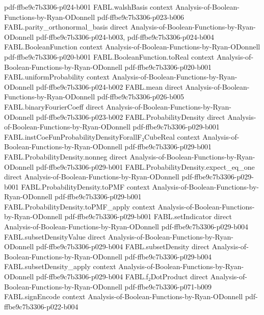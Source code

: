 \begin{theorem}
  {pdf-ffbe9c7b3306-p024-b001}
\proofstep
  {FABL.walshBasis}
  {context}
  {Analysis-of-Boolean-Functions-by-Ryan-ODonnell}
  {pdf-ffbe9c7b3306-p023-b006}
\proofstep
  {FABL.parity_orthonormal_basis}
  {direct}
  {Analysis-of-Boolean-Functions-by-Ryan-ODonnell}
  {pdf-ffbe9c7b3306-p024-b003,
    pdf-ffbe9c7b3306-p024-b004}
\proofstep
  {FABL.BooleanFunction}
  {context}
  {Analysis-of-Boolean-Functions-by-Ryan-ODonnell}
  {pdf-ffbe9c7b3306-p020-b001}
\proofstep
  {FABL.BooleanFunction.toReal}
  {context}
  {Analysis-of-Boolean-Functions-by-Ryan-ODonnell}
  {pdf-ffbe9c7b3306-p020-b001}
\proofstep
  {FABL.uniformProbability}
  {context}
  {Analysis-of-Boolean-Functions-by-Ryan-ODonnell}
  {pdf-ffbe9c7b3306-p024-b002}
\proofstep
  {FABL.mean}
  {direct}
  {Analysis-of-Boolean-Functions-by-Ryan-ODonnell}
  {pdf-ffbe9c7b3306-p026-b005}
\proofstep
  {FABL.binaryFourierCoeff}
  {direct}
  {Analysis-of-Boolean-Functions-by-Ryan-ODonnell}
  {pdf-ffbe9c7b3306-p023-b002}
\proofstep
  {FABL.ProbabilityDensity}
  {direct}
  {Analysis-of-Boolean-Functions-by-Ryan-ODonnell}
  {pdf-ffbe9c7b3306-p029-b001}
\proofstep
  {FABL.instCoeFunProbabilityDensityForallF₂CubeReal}
  {context}
  {Analysis-of-Boolean-Functions-by-Ryan-ODonnell}
  {pdf-ffbe9c7b3306-p029-b001}
\proofstep
  {FABL.ProbabilityDensity.nonneg}
  {direct}
  {Analysis-of-Boolean-Functions-by-Ryan-ODonnell}
  {pdf-ffbe9c7b3306-p029-b001}
\proofstep
  {FABL.ProbabilityDensity.expect_eq_one}
  {direct}
  {Analysis-of-Boolean-Functions-by-Ryan-ODonnell}
  {pdf-ffbe9c7b3306-p029-b001}
\proofstep
  {FABL.ProbabilityDensity.toPMF}
  {context}
  {Analysis-of-Boolean-Functions-by-Ryan-ODonnell}
  {pdf-ffbe9c7b3306-p029-b001}
\proofstep
  {FABL.ProbabilityDensity.toPMF_apply}
  {context}
  {Analysis-of-Boolean-Functions-by-Ryan-ODonnell}
  {pdf-ffbe9c7b3306-p029-b001}
\proofstep
  {FABL.setIndicator}
  {direct}
  {Analysis-of-Boolean-Functions-by-Ryan-ODonnell}
  {pdf-ffbe9c7b3306-p029-b004}
\proofstep
  {FABL.subsetDensityValue}
  {direct}
  {Analysis-of-Boolean-Functions-by-Ryan-ODonnell}
  {pdf-ffbe9c7b3306-p029-b004}
\proofstep
  {FABL.subsetDensity}
  {direct}
  {Analysis-of-Boolean-Functions-by-Ryan-ODonnell}
  {pdf-ffbe9c7b3306-p029-b004}
\proofstep
  {FABL.subsetDensity_apply}
  {context}
  {Analysis-of-Boolean-Functions-by-Ryan-ODonnell}
  {pdf-ffbe9c7b3306-p029-b004}
\proofstep
  {FABL.f₂DotProduct}
  {direct}
  {Analysis-of-Boolean-Functions-by-Ryan-ODonnell}
  {pdf-ffbe9c7b3306-p071-b009}
\proofstep
  {FABL.signEncode}
  {context}
  {Analysis-of-Boolean-Functions-by-Ryan-ODonnell}
  {pdf-ffbe9c7b3306-p022-b004}

\end{theorem}
